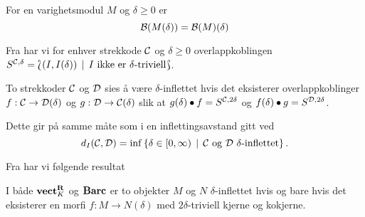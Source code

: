\begin{lemma}\label{lem:VMBarcshift}
  For en varighetsmodul $M$ og $\delta\geq0$ er
  \[\mathcal{B}(M(\delta))=\mathcal{B}(M)(\delta)\]
\end{lemma}

Fra \cite{Bauer2020} har vi for enhver strekkode $\mathcal{C}$
og $\delta\geq0$ overlappkoblingen $S^{\mathcal{C},\delta}
= \Lbag (I,I(\delta))\,\mid\, \text{$I$ ikke er
$\delta$-triviell}\Rbag$.

\begin{definisjon}\label{def:InfBar}
To strekkoder $\mathcal{C}$ og $\mathcal{D}$ sies å være
  $\delta$-inflettet hvis det eksisterer overlappkoblinger
  $f:\mathcal{C}\to \mathcal{D}(\delta)$ og $g:\mathcal{D}\to\mathcal{C}(\delta)$
  slik at $g(\delta)\bullet f = S^{\mathcal{C},2\delta}$ og
  $f(\delta)\bullet g=S^{\mathcal{D},2\delta}$.
\end{definisjon}

Dette gir på samme måte som i 
en inflettingsavstand gitt ved
\[d_I(\mathcal{C},\mathcal{D})
= \inf\left\{\delta\in[0,\infty)\,\mid\,\text{$\mathcal{C}$ og
$\mathcal{D}$ $\delta$-inflettet}\right\}.\]

Fra \citep[proposisjon 4.2]{Bauer2020} har vi følgende resultat
\begin{proposisjon}\label{prop:inftriv}
  I både $\textnormal{\textbf{vect}}_K^{\textnormal{\textbf{{R}}}}$ og $\textnormal{\textbf{Barc}}$ er to objekter $M$ og
  $N$ $\delta$-inflettet hvis og bare hvis det eksisterer
  en morfi $f: M\to N(\delta)$ med $2\delta$-triviell
  kjerne og kokjerne.
\end{proposisjon}

